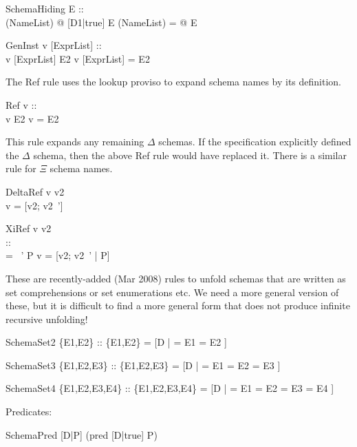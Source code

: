 \begin{zedrule}{SchemaHiding}
  E ::\power [D1| true] \\
  [D1|true]\hide (NameList) \is \exists [D2|true] @ [D1|true]
\derives
  E \hide (NameList) = \exists [D2|true] @ E
\end{zedrule}


\begin{zedrule}{GenInst}
  v [ExprList] :: \power [D | true] \\
  v [ExprList] \hasDefn E2
\derives
  v [ExprList] = E2
\end{zedrule}

The Ref rule uses the lookup proviso to expand schema names by its
definition.

\begin{zedrule}{Ref}
  v :: \power [D | true] \\
  v \hasDefn E2
\derives
  v = E2
\end{zedrule}

This rule expands any remaining $\Delta$ schemas.  If the
specification explicitly defined the $\Delta$ schema, then the above
Ref rule would have replaced it.  There is a similar rule for $\Xi$
schema names.

\begin{zedrule}{DeltaRef}
  \Delta \unprefix v \is v2 \\
\derives
  v = [v2; v2~']
\end{zedrule}

\begin{zedrule}{XiRef}
  \Xi \unprefix v \is v2 \\
  [v2|true] :: \power [D2 | true] \\
  \theta [D2|true] = \theta [D2|true]~' \iff P
\derives
  v = [v2; v2~' | P]
\end{zedrule}

These are recently-added (Mar 2008) rules to unfold schemas that
are written as set comprehensions or set enumerations etc.
We need a more general version of these, but it is difficult to find 
a more general form that does not produce infinite recursive unfolding!
\begin{zedrule}{SchemaSet2}
  \{E1,E2\} :: \power [D | true]
\derives
  \{E1,E2\} = [D | \theta [D|true] = E1 
              \lor \theta [D|true] = E2 ]
\end{zedrule}
\begin{zedrule}{SchemaSet3}
  \{E1,E2,E3\} :: \power [D | true]
\derives
  \{E1,E2,E3\} = [D | \theta [D|true] = E1
                 \lor \theta [D|true] = E2
                 \lor \theta [D|true] = E3 ]
\end{zedrule}
\begin{zedrule}{SchemaSet4}
  \{E1,E2,E3,E4\} :: \power [D | true]
\derives
  \{E1,E2,E3,E4\} = [D | \theta [D|true] = E1 
                 \lor \theta [D|true] = E2
                 \lor \theta [D|true] = E3
                 \lor \theta [D|true] = E4 ]
\end{zedrule}


Predicates:

\begin{zedrule}{SchemaPred}
  [D|P] \iff (pred [D|true] \land P)
\end{zedrule}
